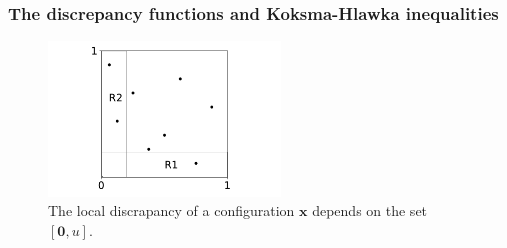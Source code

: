 \documentclass[twoside,11pt]{book}
\numberwithin{theorem}{chapter}
\numberwithin{definition}{chapter}
\numberwithin{proposition}{chapter}
\numberwithin{corollary}{chapter}
\numberwithin{example}{chapter}
\numberwithin{lemma}{chapter}
\begin{document}




 
\subsubsection{The discrepancy functions and Koksma-Hlawka inequalities}

\begin{figure}
\centering
\includegraphics[width= 0.55\textwidth]{img/discrepancy/local_discrepancy.pdf}
\caption{The local discrapancy of a configuration $\bm{x}$ depends on the set $[\bm{0},u]$. \label{fig:local_discrepancy}}
\end{figure}
\end{document}
